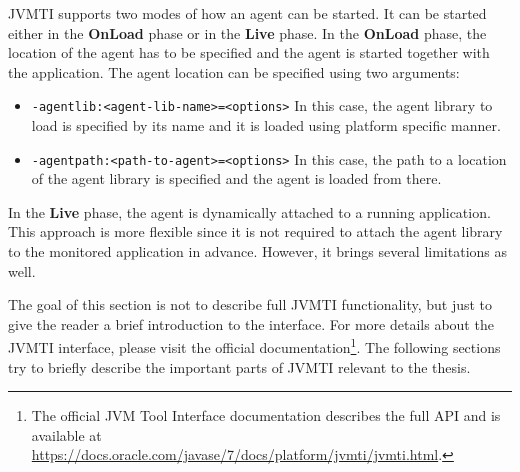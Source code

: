 JVMTI supports two modes of how an agent can be started. It can be started either in the \textbf{OnLoad} phase or in the \textbf{Live} phase. In the \textbf{OnLoad} phase, the location of the agent has to be specified and the agent is started together with the application. The agent location can be specified using two arguments:
\begin{itemize}
	\item \texttt{-agentlib:<agent-lib-name>=<options>} \newline
	In this case, the agent library to load is specified by its name and it is loaded using platform specific manner.
	\item \texttt{-agentpath:<path-to-agent>=<options>} \newline
	In this case, the path to a location of the agent library is specified and the agent is loaded from there.
\end{itemize}

In the \textbf{Live} phase, the agent is dynamically attached to a running application. This approach is more flexible since it is not required to attach the agent library to the monitored application in advance. However, it brings several limitations as well.

The goal of this section is not to describe full JVMTI functionality, but just to give the reader a brief introduction to the interface. For more details about the JVMTI interface, please visit the official documentation\footnote{The official JVM Tool Interface documentation describes the full API and is available at \url{https://docs.oracle.com/javase/7/docs/platform/jvmti/jvmti.html}.}. The following sections try to briefly describe the important parts of JVMTI relevant to the thesis.

